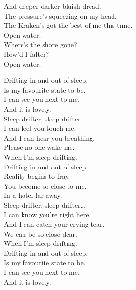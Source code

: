 And deeper darker bluish dread. \\
The pressure's squeezing on my head. \\
The Kraken's got the best of me this time. \\

Open water. \\
Where's the shore gone? \\
How'd I falter? \\
Open water. \\




Drifting in and out of sleep. \\
Is my favourite state to be. \\
I can see you next to me. \\
And it is lovely. \\

Sleep drifter, sleep drifter… \\

I can feel you touch me. \\
And I can hear you breathing. \\
Please no one wake me. \\
When I'm sleep drifting. \\

Drifting in and out of sleep. \\
Reality begins to fray. \\
You become so close to me. \\
In a hotel far away. \\

Sleep drifter, sleep drifter… \\

I can know you're right here. \\
And I can catch your crying tear. \\
We can be so close dear. \\
When I'm sleep drifting. \\

Drifting in and out of sleep. \\
Is my favourite state to be. \\
I can see you next to me. \\
And it is lovely. \\

